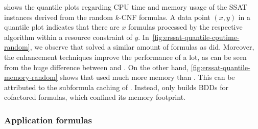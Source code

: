  shows the quantile plots regarding CPU time and memory usage
of the SSAT instances derived from the random $k$-CNF formulas.
A data point $(x,y)$ in a quantile plot indicates that
there are $x$ formulas processed by the respective algorithm within a resource constraint of $y$.
In~\cref{fig:erssat-quantile-cputime-random},
we observe that \erssat solved a similar amount of formulas as \dcssat did.
Moreover, the enhancement techniques improve the performance of \erssat a lot,
as can be seen from the huge difference between \erssat and \erssatb.
On the other hand,
\cref{fig:erssat-quantile-memory-random} shows that \dcssat used much more memory than \erssat.
This can be attributed to the subformula caching of \dcssat.
Instead, \erssat only builds BDDs for cofactored formulas, which confined its memory footprint.

\subsubsection{Application formulas}

